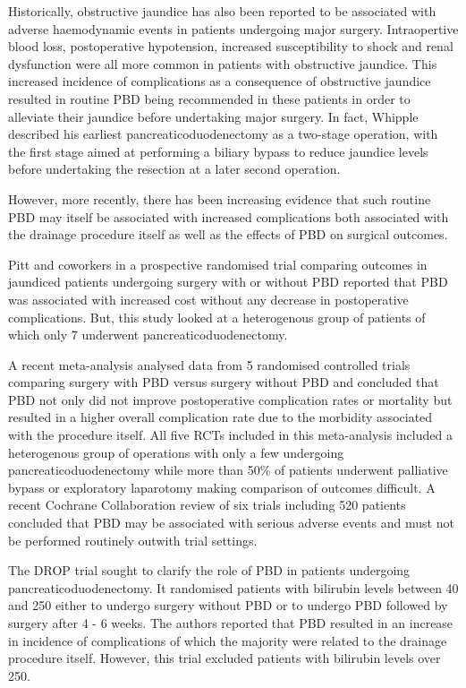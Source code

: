Historically, obstructive jaundice has also been reported to be associated with adverse haemodynamic events in patients undergoing major surgery. Intraopertive blood loss, postoperative hypotension, increased susceptibility to shock and renal dysfunction were all more common in patients with obstructive jaundice. This increased incidence of complications as a consequence of obstructive jaundice resulted in routine PBD being recommended in these patients in order to alleviate their jaundice before undertaking major surgery. In fact, Whipple described his earliest pancreaticoduodenectomy as a two-stage operation, with the first stage aimed at performing a biliary bypass to reduce jaundice levels before undertaking the resection at a later second operation.

However, more recently, there has been increasing evidence that such routine PBD may itself be associated with increased complications both associated with the drainage procedure itself as well as the effects of PBD on surgical outcomes.

Pitt and coworkers in a prospective randomised trial comparing outcomes in jaundiced patients undergoing surgery with or without PBD reported that PBD was associated with increased cost without any decrease in postoperative complications.\parencite{pitt_does_1985} But, this study looked at a heterogenous group of patients of which only 7 underwent pancreaticoduodenectomy.

A recent meta-analysis\parencite{sewnath_meta-analysis_2002} analysed data from 5 randomised controlled trials comparing surgery with PBD versus surgery without PBD and concluded that PBD not only did not improve postoperative complication rates or mortality but resulted in a higher overall complication rate due to the morbidity associated with the procedure itself. All five RCTs included in this meta-analysis included a heterogenous group of operations with only a few undergoing pancreaticoduodenectomy while more than 50\% of patients underwent palliative bypass or exploratory laparotomy making comparison of outcomes difficult. A recent Cochrane Collaboration review of six trials including 520 patients concluded that PBD may be associated with serious adverse events and must not be performed routinely outwith trial settings.\parencite{wang_preoperative_2008}

The DROP trial sought to clarify the role of PBD in patients undergoing pancreaticoduodenectomy.\parencite{van_der_gaag_preoperative_2010} It randomised patients with bilirubin levels between 40 and 250 either to undergo surgery without PBD or to undergo PBD followed by surgery after 4 - 6 weeks. The authors reported that PBD resulted in an increase in incidence of complications of which the majority were related to the drainage procedure itself. However, this trial excluded patients with bilirubin levels over 250.

